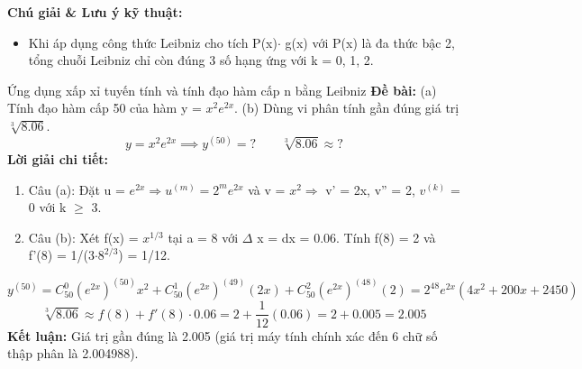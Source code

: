 \documentclass[11pt,a4paper,oneside]{book}
\begin{document}
\noindent\textbf{Chú giải \& Lưu ý kỹ thuật:}
\begin{itemize}[leftmargin=1.5em, itemsep=2pt]
  \item Khi áp dụng công thức Leibniz cho tích P(x)$\cdot$ g(x) với P(x) là đa thức bậc 2, tổng chuỗi Leibniz chỉ còn đúng 3 số hạng ứng với k = 0, 1, 2.
\end{itemize}

\begin{vidu}{Ứng dụng xấp xỉ tuyến tính và tính đạo hàm cấp n bằng Leibniz}
\textbf{Đề bài:} (a) Tính đạo hàm cấp 50 của hàm y = $x^2 e^{2x}$. (b) Dùng vi phân tính gần đúng giá trị $\sqrt[3]{8.06}$.
\[ y = x^2 e^{2x} \implies y^{(50)} = ? \qquad \sqrt[3]{8.06} \approx ? \]
\textbf{Lời giải chi tiết:}
\begin{enumerate}[leftmargin=1.5em, itemsep=2pt]
  \item Câu (a): Đặt u = $e^{2x} \Rightarrow u^{(m)} = 2^m e^{2x}$ và v = $x^2 \Rightarrow$  v' = 2x, v'' = 2, $v^{(k)}$ = 0 với k $\ge$  3.
  \item Câu (b): Xét f(x) = $x^{1/3}$ tại a = 8 với $\Delta$ x = dx = 0.06. Tính f(8) = 2 và f'(8) = 1/(3$\cdot 8^{2/3}$) = 1/12.
\end{enumerate}
\[ y^{(50)} = C_{50}^0 (e^{2x})^{(50)} x^2 + C_{50}^1 (e^{2x})^{(49)} (2x) + C_{50}^2 (e^{2x})^{(48)} (2) = 2^{48} e^{2x} (4x^2 + 200x + 2450) \]
\[ \sqrt[3]{8.06} \approx f(8) + f'(8)\cdot 0.06 = 2 + \frac{1}{12}(0.06) = 2 + 0.005 = 2.005 \]
\noindent\textbf{Kết luận:} Giá trị gần đúng là 2.005 (giá trị máy tính chính xác đến 6 chữ số thập phân là 2.004988).
\end{vidu}
\end{document}
